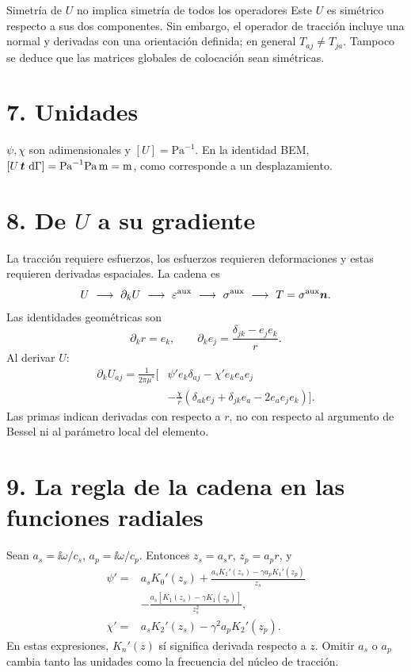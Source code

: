 \documentclass[11pt]{article}
\begin{document}
\begin{alerta}{Simetría de \(U\) no implica simetría de todos los operadores}
Este \(U\) es simétrico respecto a sus dos componentes. Sin embargo,
el operador de tracción incluye una normal y derivadas con una orientación
definida; en general \(T_{aj}\ne T_{ja}\).
Tampoco se deduce que las matrices globales de colocación sean simétricas.
\end{alerta}

\section*{7. Unidades}
\(\psi,\chi\) son adimensionales y \([U]=\mathrm{Pa}^{-1}\).
En la identidad BEM,
\([U\,\bm{t}\,\,\mathrm{d}\Gamma]=\mathrm{Pa}^{-1}\mathrm{Pa}\,\mathrm m=\mathrm m\),
como corresponde a un desplazamiento.

\newpage
\section*{8. De \(U\) a su gradiente}
La tracción requiere esfuerzos, los esfuerzos requieren deformaciones y
estas requieren derivadas espaciales. La cadena es
\[
 U\ \longrightarrow\ \partial_kU\
 \longrightarrow\ \varepsilon^{\mathrm{aux}}\
 \longrightarrow\ \sigma^{\mathrm{aux}}\
 \longrightarrow\ T=\sigma^{\mathrm{aux}}\bm{n}.
\]
Las identidades geométricas son
\[
 \partial_kr=e_k,\qquad
 \partial_ke_j=\frac{\delta_{jk}-e_je_k}{r}.
\]
Al derivar \(U\):
\[
\begin{aligned}
 \partial_kU_{aj}=\frac1{2\pi\mu^*}\bigg[
 &\psi'e_k\delta_{aj}-\chi'e_ke_ae_j\\
 &-\frac{\chi}{r}
 (\delta_{ak}e_j+\delta_{jk}e_a-2e_ae_je_k)\bigg].
\end{aligned}
\]
Las primas indican derivadas con respecto a \(r\), no con respecto al
argumento de Bessel ni al parámetro local del elemento.

\section*{9. La regla de la cadena en las funciones radiales}
Sean \(a_s=\ii\omega/c_s\), \(a_p=\ii\omega/c_p\). Entonces
\(z_s=a_sr\), \(z_p=a_pr\), y
\[
\begin{aligned}
 \psi'={}&a_sK_0'(z_s)
 +\frac{a_sK_1'(z_s)-\gamma a_pK_1'(z_p)}{z_s}\\
 &-\frac{a_s[K_1(z_s)-\gamma K_1(z_p)]}{z_s^2},\\
 \chi'={}&a_sK_2'(z_s)-\gamma^2a_pK_2'(z_p).
\end{aligned}
\]
En estas expresiones, \(K_n'(z)\) sí significa derivada respecto a \(z\).
Omitir \(a_s\) o \(a_p\) cambia tanto las unidades como la frecuencia
del núcleo de tracción.
\end{document}
